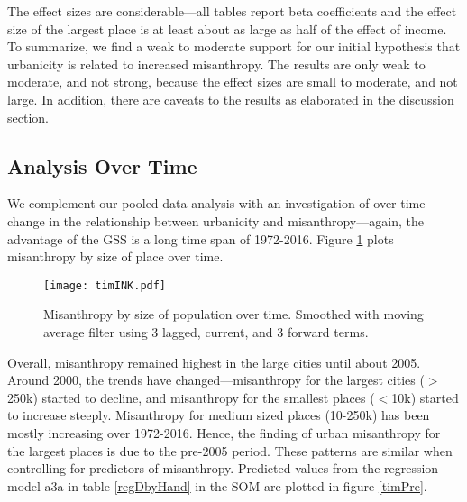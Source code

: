 \documentclass[11pt, letterpaper]{article}
\begin{document}
\begin{spacing}{1.4}


The effect sizes are considerable---all tables report beta coefficients
and the effect size of the largest place is at least about as large as half of the effect
of income.  To summarize, we find a weak to moderate support for our initial
hypothesis that urbanicity is related to increased misanthropy. The results are
only weak to moderate, and not strong, because the effect sizes are small to
moderate, and not large. In addition, there are caveats to the results as elaborated in the discussion section.

\newpage
\subsection*{Analysis Over Time}

We complement our pooled data analysis with an investigation of over-time change
in the relationship between urbanicity and misanthropy---again, the advantage of the GSS
is a long time span of 1972-2016. Figure \ref{tim} plots misanthropy by size of
place over time.

\begin{figure}[H]
  \texttt{[image: timINK.pdf]}\centering
\caption{Misanthropy by size of population over time. Smoothed with moving average filter using 3 lagged, current, and 3 forward terms.}\label{tim}%
\end{figure}

Overall, misanthropy remained highest in the large cities until
about 2005. Around 2000, the trends have changed---misanthropy for the largest
cities ($>$250k) started to decline, and misanthropy for the smallest places
($<$10k) started to increase steeply. Misanthropy for medium
sized places (10-250k) has been mostly increasing over 1972-2016. Hence, the
finding of urban misanthropy for the largest places is due to the pre-2005 period.
%
These patterns are similar when controlling for predictors of
misanthropy. Predicted values from the regression model a3a in table \ref{regDbyHand} in
the SOM are plotted in figure \ref{timPre}. 



\end{spacing}
\end{document}
